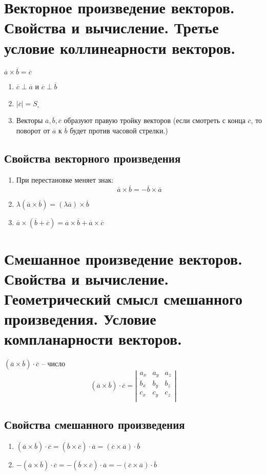 \documentclass[12pt, fleqn]{article}
\begin{document}
\section{Векторное произведение векторов. Свойства и вычисление. Третье условие коллинеарности векторов.}
$\overline{a}\times\overline{b}=\overline{c}$
\begin{enumerate}
	\item $\overline{c}\perp\overline{a}$ и $\overline{c}\perp\overline{b}$
	\item $\left|\overline{c}\right|=S_\square$
	\item Векторы $\overline{a}, \overline{b}, \overline{c}$ образуют правую тройку векторов (если смотреть с конца $\overline{c}$, то поворот от $\overline{a}$ к $\overline{b}$ будет против часовой стрелки.)
\end{enumerate}
\subsection*{Свойства векторного произведения}
\begin{enumerate}
	\item При перестановке меняет знак:
	$$\overline{a}\times\overline{b}=-\overline{b}\times\overline{a}$$
	\item $\lambda \left(\overline{a}\times\overline{b}\right)=\left(\lambda \overline{a}\right)\times\overline{b}$
	\item $\overline{a} \times \left(\overline{b}+\overline{c}\right)=\overline{a}\times \overline{b}+\overline{a}\times \overline{c}$
\end{enumerate}
\section{Смешанное произведение векторов. Свойства и вычисление. Геометрический смысл смешанного произведения. Условие компланарности векторов.}
$\left(\overline{a}\times\overline{b}\right)\cdot\overline{c}$ -- число
\begin{equation*}
	\left(\overline{a}\times\overline{b}\right)\cdot\overline{c} = \left|\begin{matrix}
		a_x&a_y&a_z\\
		b_x&b_y&b_z\\
		c_x&c_y&c_z\\
	\end{matrix}\right|
\end{equation*}
\subsection*{Свойства смешанного произведения}
\begin{enumerate}
	\item $\left(\overline{a}\times\overline{b}\right)\cdot\overline{c}=\left(\overline{b}\times\overline{c}\right)\cdot\overline{a}=\left(\overline{c}\times\overline{a}\right)\cdot\overline{b}$
	\item $-\left(\overline{a}\times\overline{b}\right)\cdot\overline{c}=-\left(\overline{b}\times\overline{c}\right)\cdot\overline{a}=-\left(\overline{c}\times\overline{a}\right)\cdot\overline{b}$
\end{enumerate}
\end{document}
